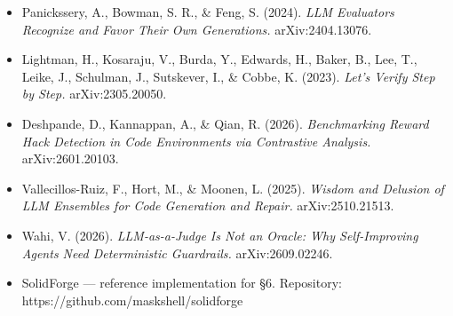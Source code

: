 \documentclass[
  11pt,
]{article}
\begin{document}
\begin{itemize}
\item
  Panickssery, A., Bowman, S. R., \& Feng, S. (2024). \emph{LLM
  Evaluators Recognize and Favor Their Own Generations.}
  arXiv:2404.13076.
\item
  Lightman, H., Kosaraju, V., Burda, Y., Edwards, H., Baker, B., Lee,
  T., Leike, J., Schulman, J., Sutskever, I., \& Cobbe, K. (2023).
  \emph{Let's Verify Step by Step.} arXiv:2305.20050.
\item
  Deshpande, D., Kannappan, A., \& Qian, R. (2026). \emph{Benchmarking
  Reward Hack Detection in Code Environments via Contrastive Analysis.}
  arXiv:2601.20103.
\item
  Vallecillos-Ruiz, F., Hort, M., \& Moonen, L. (2025). \emph{Wisdom and
  Delusion of LLM Ensembles for Code Generation and Repair.}
  arXiv:2510.21513.
\item
  Wahi, V. (2026). \emph{LLM-as-a-Judge Is Not an Oracle: Why
  Self-Improving Agents Need Deterministic Guardrails.}
  arXiv:2609.02246.
\item
  SolidForge --- reference implementation for §6. Repository:
  https://github.com/maskshell/solidforge
\end{itemize}
\end{document}
